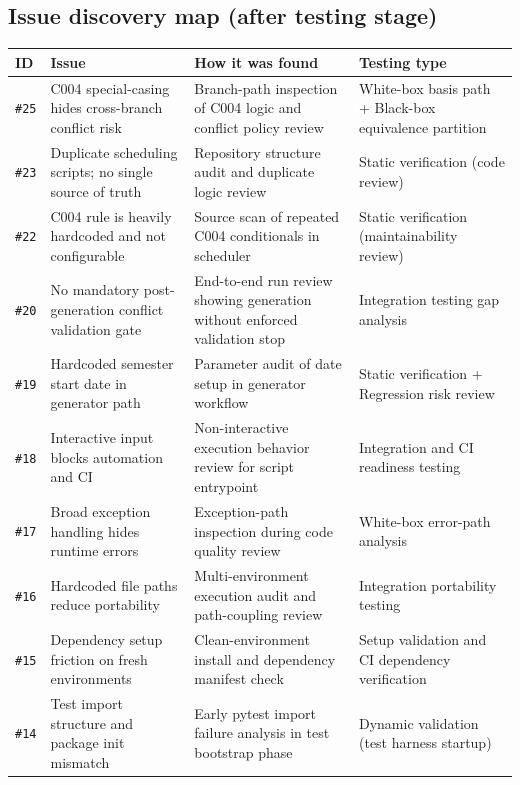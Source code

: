 \documentclass[12pt,a4paper]{article}
\begin{document}
\subsection{Issue discovery map (after testing stage)}
{\small
\setlength{\tabcolsep}{3pt}
\begin{longtable}{>{\raggedright\arraybackslash}p{}>{\raggedright\arraybackslash}p{}>{\raggedright\arraybackslash}p{}>{\raggedright\arraybackslash}p{}}
\toprule
\textbf{ID} & \textbf{Issue} & \textbf{How it was found} & \textbf{Testing type} \\
\midrule
\endhead
\texttt{\#25} & C004 special-casing hides cross-branch conflict risk & Branch-path inspection of C004 logic and conflict policy review & White-box basis path + Black-box equivalence partition \\
\texttt{\#23} & Duplicate scheduling scripts; no single source of truth & Repository structure audit and duplicate logic review & Static verification (code review) \\
\texttt{\#22} & C004 rule is heavily hardcoded and not configurable & Source scan of repeated C004 conditionals in scheduler & Static verification (maintainability review) \\
\texttt{\#20} & No mandatory post-generation conflict validation gate & End-to-end run review showing generation without enforced validation stop & Integration testing gap analysis \\
\texttt{\#19} & Hardcoded semester start date in generator path & Parameter audit of date setup in generator workflow & Static verification + Regression risk review \\
\texttt{\#18} & Interactive input blocks automation and CI & Non-interactive execution behavior review for script entrypoint & Integration and CI readiness testing \\
\texttt{\#17} & Broad exception handling hides runtime errors & Exception-path inspection during code quality review & White-box error-path analysis \\
\texttt{\#16} & Hardcoded file paths reduce portability & Multi-environment execution audit and path-coupling review & Integration portability testing \\
\texttt{\#15} & Dependency setup friction on fresh environments & Clean-environment install and dependency manifest check & Setup validation and CI dependency verification \\
\texttt{\#14} & Test import structure and package init mismatch & Early pytest import failure analysis in test bootstrap phase & Dynamic validation (test harness startup) \\

\end{longtable}}
\end{document}
